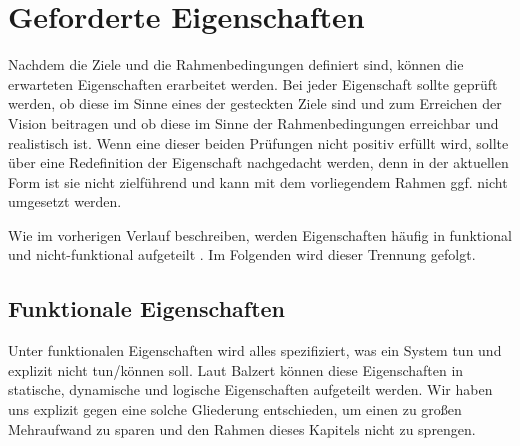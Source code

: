 \section{Geforderte Eigenschaften}
Nachdem die Ziele und die Rahmenbedingungen definiert sind, können die erwarteten Eigenschaften erarbeitet werden. Bei jeder Eigenschaft sollte geprüft werden, ob diese im Sinne eines der gesteckten Ziele sind und zum Erreichen der Vision beitragen und ob diese im Sinne der Rahmenbedingungen erreichbar und realistisch ist. Wenn eine dieser beiden Prüfungen nicht positiv erfüllt wird, sollte über eine Redefinition der Eigenschaft nachgedacht werden, denn in der aktuellen Form ist sie nicht zielführend und kann mit dem vorliegendem Rahmen ggf. nicht umgesetzt werden.

\vspace{0.25cm}

Wie im vorherigen Verlauf beschreiben, werden Eigenschaften häufig in funktional und nicht-funktional aufgeteilt \cite{Balzert.2009}. Im Folgenden wird dieser Trennung gefolgt.

\subsection{Funktionale Eigenschaften}
Unter funktionalen Eigenschaften wird alles spezifiziert, was ein System tun und explizit nicht tun/können soll. Laut Balzert können diese Eigenschaften in statische, dynamische und logische Eigenschaften aufgeteilt werden\cite{Balzert.2009}. Wir haben uns explizit gegen eine solche Gliederung entschieden, um einen zu großen Mehraufwand zu sparen und den Rahmen dieses Kapitels nicht zu sprengen.

\vspace{0.25cm}

